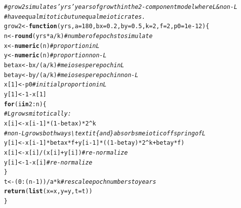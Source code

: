 \documentclass{article}\usepackage[]{graphicx}\usepackage[]{color}
\makeatletter
\newcommand{\hlnum}[1]{\textcolor[rgb]{0.686,0.059,0.569}{#1}}%
\newcommand{\hlcom}[1]{\textcolor[rgb]{0.678,0.584,0.686}{\textit{#1}}}%
\newcommand{\hlopt}[1]{\textcolor[rgb]{0,0,0}{#1}}%
\newcommand{\hlstd}[1]{\textcolor[rgb]{0.345,0.345,0.345}{#1}}%
\newcommand{\hlkwa}[1]{\textcolor[rgb]{0.161,0.373,0.58}{\textbf{#1}}}%
\newcommand{\hlkwb}[1]{\textcolor[rgb]{0.69,0.353,0.396}{#1}}%
\newcommand{\hlkwc}[1]{\textcolor[rgb]{0.333,0.667,0.333}{#1}}%
\newcommand{\hlkwd}[1]{\textcolor[rgb]{0.737,0.353,0.396}{\textbf{#1}}}%
\newenvironment{kframe}{%
 \def\at@end@of@kframe{}%
 \ifinner\ifhmode%
  \def\at@end@of@kframe{\end{minipage}}%
  \begin{minipage}{\columnwidth}%
 \fi\fi%
 \def\FrameCommand##1{\hskip\@totalleftmargin \hskip-\fboxsep
 \colorbox{shadecolor}{##1}\hskip-\fboxsep
     \hskip-\linewidth \hskip-\@totalleftmargin \hskip\columnwidth}%
 \MakeFramed {\advance\hsize-\width
   \@totalleftmargin\z@ \linewidth\hsize
   \@setminipage}}%
 {\par\unskip\endMakeFramed%
 \at@end@of@kframe}
\newenvironment{knitrout}{}{} %
\makeatother
\begin{document}
\begin{knitrout}\footnotesize
{}\color{fgcolor}\begin{kframe}
\begin{alltt}
\hlcom{# grow2 simulates 'yrs' years of growth in the 2-component model where L & non-L  }
\hlcom{# have equal mitotic but unequal meiotic rates.}
\hlstd{grow2} \hlkwb{<-} \hlkwa{function}\hlstd{(}\hlkwc{yrs}\hlstd{,} \hlkwc{a}\hlstd{=}\hlnum{180}\hlstd{,} \hlkwc{bx}\hlstd{=}\hlnum{0.2}\hlstd{,} \hlkwc{by}\hlstd{=}\hlnum{0.5}\hlstd{,} \hlkwc{k}\hlstd{=}\hlnum{2}\hlstd{,} \hlkwc{f}\hlstd{=}\hlnum{2}\hlstd{,} \hlkwc{p0}\hlstd{=}\hlnum{1e-12}\hlstd{)\{}
  \hlstd{n} \hlkwb{<-} \hlkwd{round}\hlstd{(yrs}\hlopt{*}\hlstd{a}\hlopt{/}\hlstd{k)} \hlcom{# number of epochs to simulate}
  \hlstd{x} \hlkwb{<-} \hlkwd{numeric}\hlstd{(n)}     \hlcom{# proportion in L}
  \hlstd{y} \hlkwb{<-} \hlkwd{numeric}\hlstd{(n)}     \hlcom{# proportion non-L}
  \hlstd{betax} \hlkwb{<-} \hlstd{bx}\hlopt{/}\hlstd{(a}\hlopt{/}\hlstd{k)}   \hlcom{# meioses per epoch in L}
  \hlstd{betay} \hlkwb{<-} \hlstd{by}\hlopt{/}\hlstd{(a}\hlopt{/}\hlstd{k)}   \hlcom{# meioses per epoch in non-L}
  \hlstd{x[}\hlnum{1}\hlstd{]} \hlkwb{<-} \hlstd{p0}          \hlcom{# initial proportion in L}
  \hlstd{y[}\hlnum{1}\hlstd{]} \hlkwb{<-} \hlnum{1}\hlopt{-}\hlstd{x[}\hlnum{1}\hlstd{]}
  \hlkwa{for}\hlstd{(i} \hlkwa{in} \hlnum{2}\hlopt{:}\hlstd{n)\{}
    \hlcom{# L grows mitotically:}
    \hlstd{x[i]} \hlkwb{<-} \hlstd{x[i}\hlopt{-}\hlnum{1}\hlstd{]}\hlopt{*}\hlstd{(}\hlnum{1}\hlopt{-}\hlstd{betax)}\hlopt{*}\hlnum{2}\hlopt{^}\hlstd{k}
    \hlcom{# non-L grows both ways \textbackslash{}textit\{and\} absorbs meiotic offspring of L}
    \hlstd{y[i]} \hlkwb{<-} \hlstd{x[i}\hlopt{-}\hlnum{1}\hlstd{]}\hlopt{*}\hlstd{betax}\hlopt{*}\hlstd{f} \hlopt{+} \hlstd{y[i}\hlopt{-}\hlnum{1}\hlstd{]}\hlopt{*}\hlstd{((}\hlnum{1}\hlopt{-}\hlstd{betay)}\hlopt{*}\hlnum{2}\hlopt{^}\hlstd{k} \hlopt{+} \hlstd{betay}\hlopt{*}\hlstd{f)}
    \hlstd{x[i]} \hlkwb{<-} \hlstd{x[i]}\hlopt{/}\hlstd{(x[i]}\hlopt{+}\hlstd{y[i])}  \hlcom{# re-normalize}
    \hlstd{y[i]} \hlkwb{<-} \hlnum{1}\hlopt{-}\hlstd{x[i]}            \hlcom{# re-normalize}
  \hlstd{\}}
  \hlstd{t} \hlkwb{<-} \hlstd{(}\hlnum{0}\hlopt{:}\hlstd{(n}\hlopt{-}\hlnum{1}\hlstd{))}\hlopt{/}\hlstd{a}\hlopt{*}\hlstd{k}  \hlcom{# rescale epoch numbers to years}
  \hlkwd{return}\hlstd{(}\hlkwd{list}\hlstd{(}\hlkwc{x}\hlstd{=x,} \hlkwc{y}\hlstd{=y,} \hlkwc{t}\hlstd{=t))}
\hlstd{\}}
\end{alltt}
\end{kframe}
\end{knitrout}
\end{document}
